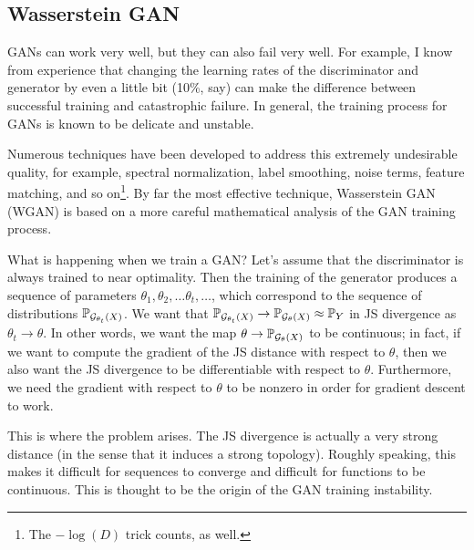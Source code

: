 \documentclass{article}
\begin{document}
	\subsection{Wasserstein GAN}
	
	GANs can work very well, but they can also fail very well. For example, I know from experience that changing the learning rates of the discriminator and generator by even a little bit (10\%, say) can make the difference between successful training and catastrophic failure. In general, the training process for GANs is known to be delicate and unstable.
	
	Numerous techniques have been developed to address this extremely undesirable quality, for example, spectral normalization, label smoothing, noise terms, feature matching, and so on\footnote{The \(-\log(D)\) trick counts, as well.}. By far the most effective technique, Wasserstein GAN (WGAN) is based on a more careful mathematical analysis of the GAN training process.
	
	What is happening when we train a GAN? Let's assume that the discriminator is always trained to near optimality. Then the training of the generator produces a sequence of parameters \(\theta_1, \theta_2, \dots \theta_t, \dots\), which correspond to the sequence of distributions \(\mathbb{P}_{\mathcal{G}_{\theta_t}(X)}\). We want that \(\mathbb{P}_{\mathcal{G}_{\theta_t}(X)} \to \mathbb{P}_{\mathcal{G}_{\theta}(X)} \approx \mathbb{P}_Y\) in JS divergence as \(\theta_t \to \theta\). In other words, we want the map \(\theta \to \mathbb{P}_{\mathcal{G}_\theta(X)}\) to be continuous; in fact, if we want to compute the gradient of the JS distance with respect to \(\theta\), then we also want the JS divergence to be differentiable with respect to \(\theta\). Furthermore, we need the gradient with respect to \(\theta\) to be nonzero in order for gradient descent to work.
	
	This is where the problem arises. The JS divergence is actually a very strong distance (in the sense that it induces a strong topology). Roughly speaking, this makes it difficult for sequences to converge and difficult for functions to be continuous. This is thought to be the origin of the GAN training instability.
	
\end{document}
